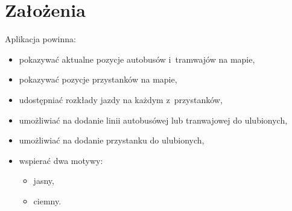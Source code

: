 \documentclass{SGGW-thesis}
\begin{document}
\section{Założenia}
Aplikacja powinna:
\label{ZALOZENIA}
\begin{itemize}
  \item{pokazywać aktualne pozycje autobusów i~tramwajów na mapie,}
  \item{pokazywać pozycje przystanków na mapie,}
  \item{udostępniać rozkłady jazdy na każdym z~przystanków,}
  \item{umożliwiać na dodanie linii autobusówej lub tranwajowej do ulubionych,}
  \item{umożliwiać na dodanie przystanku do ulubionych,}
  \item{wspierać dwa motywy:}
  \begin{itemize}
    \item{jasny,}
    \item{ciemny.}
  \end{itemize}
\end{itemize}
\vfill
\pagebreak
\end{document}
